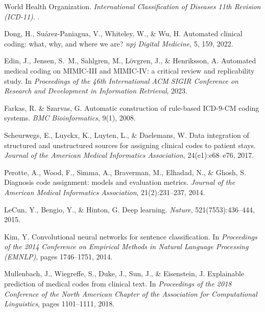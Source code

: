 \documentclass[12pt,a4paper]{report}
\begin{document}
\begin{thebibliography}{99}

World Health Organization.
\newblock \emph{International Classification of Diseases 11th Revision (ICD-11)}.
.

Dong, H., Su\'arez-Paniagua, V., Whiteley, W., \& Wu, H.
\newblock Automated clinical coding: what, why, and where we are?
\newblock \emph{npj Digital Medicine}, 5, 159, 2022.

Edin, J., Jensen, S.~M., Sahlgren, M., L{\"o}vgren, J., \& Henriksson, A.
\newblock Automated medical coding on MIMIC-III and MIMIC-IV: a critical review and replicability study.
\newblock In \emph{Proceedings of the 46th International ACM SIGIR Conference on Research and Development in Information Retrieval}, 2023.

Farkas, R. \& Szarvas, G.
\newblock Automatic construction of rule-based ICD-9-CM coding systems.
\newblock \emph{BMC Bioinformatics}, 9(1), 2008.

Scheurwegs, E., Luyckx, K., Luyten, L., \& Daelemans, W.
\newblock Data integration of structured and unstructured sources for assigning clinical codes to patient stays.
\newblock \emph{Journal of the American Medical Informatics Association}, 24(e1):e68--e76, 2017.

Perotte, A., Wood, F., Simma, A., Braverman, M., Elhadad, N., \& Ghosh, S.
\newblock Diagnosis code assignment: models and evaluation metrics.
\newblock \emph{Journal of the American Medical Informatics Association}, 21(2):231--237, 2014.

LeCun, Y., Bengio, Y., \& Hinton, G.
\newblock Deep learning.
\newblock \emph{Nature}, 521(7553):436--444, 2015.

Kim, Y.
\newblock Convolutional neural networks for sentence classification.
\newblock In \emph{Proceedings of the 2014 Conference on Empirical Methods in Natural Language Processing (EMNLP)}, pages 1746--1751, 2014.

Mullenbach, J., Wiegreffe, S., Duke, J., Sun, J., \& Eisenstein, J.
\newblock Explainable prediction of medical codes from clinical text.
\newblock In \emph{Proceedings of the 2018 Conference of the North American Chapter of the Association for Computational Linguistics}, pages 1101--1111, 2018.


\end{thebibliography}
\end{document}
